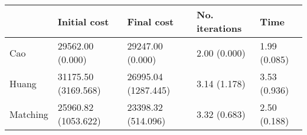 \begin{tabular}{lllll}
\toprule
{} &         Initial cost &           Final cost & No. iterations &          Time \\
\midrule
Cao      &     29562.00 (0.000) &     29247.00 (0.000) &   2.00 (0.000) &  1.99 (0.085) \\
Huang    &  31175.50 (3169.568) &  26995.04 (1287.445) &   3.14 (1.178) &  3.53 (0.936) \\
Matching &  25960.82 (1053.622) &   23398.32 (514.096) &   3.32 (0.683) &  2.50 (0.188) \\
\bottomrule
\end{tabular}
